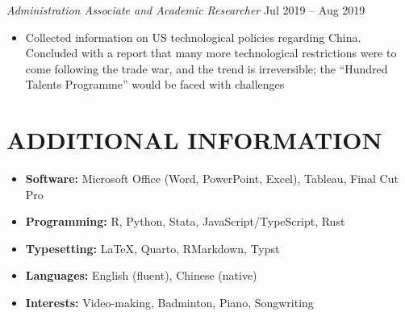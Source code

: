 \documentclass[a4paper,9pt]{extarticle}
\begin{document}
\textit{Administration Associate and Academic Researcher} \hfill Jul 2019 – Aug 2019
\begin{itemize}
    \item Collected information on US technological policies regarding China. Concluded with a report that many more technological restrictions were to come following the trade war, and the trend is irreversible; the “Hundred Talents Programme” would be faced with challenges
\end{itemize}
\section*{ADDITIONAL INFORMATION}
\begin{itemize}
    \item \textbf{Software:} Microsoft Office (Word, PowerPoint, Excel), Tableau, Final Cut Pro
    \item \textbf{Programming:} R, Python, Stata, JavaScript/TypeScript, Rust
    \item \textbf{Typesetting:} \LaTeX, Quarto, RMarkdown, Typst
    \item \textbf{Languages:} English (fluent), Chinese (native)
    \item \textbf{Interests:} Video-making, Badminton, Piano, Songwriting
\end{itemize}

\end{document}
